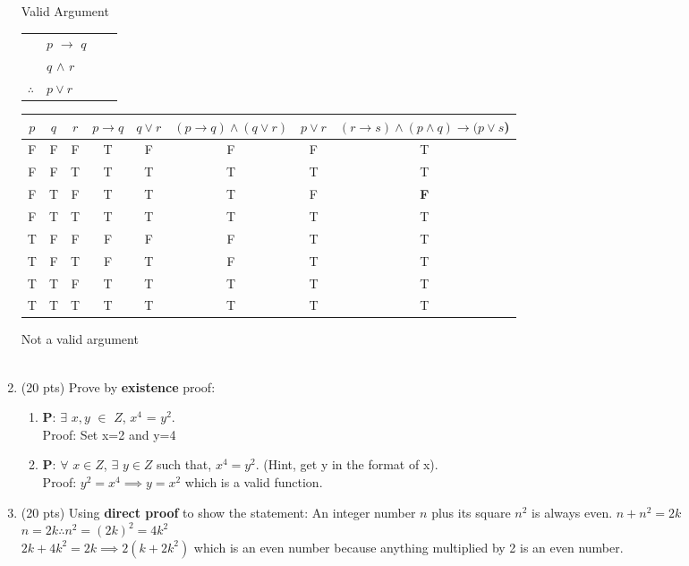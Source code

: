 \documentclass[11pt]{article}
\begin{document}
\begin{enumerate}
        Valid Argument

        \begin{tabular}{r l c c}
          &  $p$ $\rightarrow$ $q$  && \\
          &  $q$ $\wedge$ $r$ && \\
          \hline
          $\therefore $  &  $p\vee r$  
          \end{tabular}
        \begin{tabular}{|c c c|c c|c|c|c|}
          \hline
          $p$ & $q$ & $r$ & $p \rightarrow q$ & $q \vee r$ & $(p \rightarrow q) \wedge (q \vee r)$ & $p \vee r$ & $(r \rightarrow s) \wedge (p \wedge q) \rightarrow (p \vee s$) \\
          \hline
          F & F & F & T & F & F & F & T \\
          F & F & T & T & T & T & T & T \\
          \rowcolor{yellow} F & T & F & T & T & T & F & \bf{F} \\
          F & T & T & T & T & T & T & T \\
          T & F & F & F & F & F & T & T \\ 
          T & F & T & F & T & F & T & T \\
          T & T & F & T & T & T & T & T \\
          T & T & T & T & T & T & T & T \\
          \hline
          \end{tabular}
          Not a valid argument \\ \\

  \item (20 pts) Prove by \textbf{existence} proof:  
    \begin{enumerate}
      \item  {\bf P}: $\exists$ $x, y$ $\in$ $Z$, $x^4$ = $y^2$. \\
        Proof: Set x=2 and y=4

      \item  {\bf P}: $\forall$ $x \in Z$, $\exists$ $y \in Z$ such that, $x^4 = y^2$. (Hint, get y in the format of x). \\
        Proof: $y^2=x^4 \implies y=x^2$ which is a valid function.
    \end{enumerate}

  \item (20 pts) Using \textbf{direct proof} to show the statement: An integer number $n$ plus its square $n^2$ is always even. 
    $n+n^2 = 2k$ \\
    $n=2k \therefore n^2=(2k)^2=4k^2$ \\
    $2k+4k^2 = 2k \implies 2(k+2k^2)$ which is an even number because anything multiplied by 2 is an even number. \\


\end{enumerate}
\end{document}
